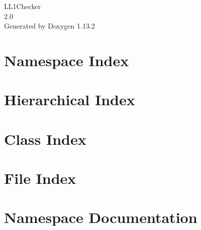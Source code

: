 \documentclass[twoside]{book}
\newcommand{\+}{\discretionary{\mbox{\scriptsize$\hookleftarrow$}}{}{}}
\newcommand{\clearemptydoublepage}{%
    \newpage{\pagestyle{empty}\cleardoublepage}%
  }
\begin{document}
  \raggedbottom
    \hypersetup{pageanchor=false,
                bookmarksnumbered=true,
                pdfencoding=unicode
               }
  \begin{titlepage}
  \vspace*{7cm}
  \begin{center}%
  {\Large LL1\+Checker}\\
  [1ex]\large 2.\+0 \\
  \vspace*{1cm}
  {\large Generated by Doxygen 1.13.2}\\
  \end{center}
  \end{titlepage}
  \clearemptydoublepage
  \tableofcontents
  \clearemptydoublepage
  \hypersetup{pageanchor=true}
\chapter{Namespace Index}

\chapter{Hierarchical Index}

\chapter{Class Index}

\chapter{File Index}

\chapter{Namespace Documentation}

\end{document}
